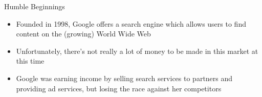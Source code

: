 \documentclass[aspectratio=169]{beamer}
\begin{document}
    {%
    \begin{frame}{Humble Beginnings}
        \begin{itemize}
            \item Founded in 1998, Google offers a search engine which allows
                users to find content on the (growing) World Wide Web
            \item Unfortunately, there's not really a lot of money to be made
                in this market at this time
            \item Google was earning income by selling search services to
                partners and providing ad services, but losing the race against
                her competitors
        \end{itemize}
    \end{frame}
    }
\end{document}
